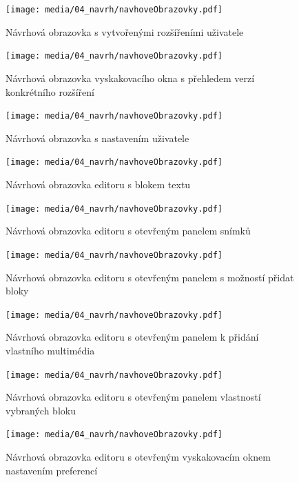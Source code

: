 \begin{figure}[ht!]
    \centering
    \texttt{[image: media/04\_navrh/navhoveObrazovky.pdf]}
    \caption{Návrhová obrazovka s vytvořenými rozšířeními uživatele}
\end{figure}

\begin{figure}[ht!]
    \centering
    \texttt{[image: media/04\_navrh/navhoveObrazovky.pdf]}
    \caption{Návrhová obrazovka vyskakovacího okna s přehledem verzí konkrétního rozšíření}
\end{figure}


\begin{figure}[ht!]
    \centering
    \texttt{[image: media/04\_navrh/navhoveObrazovky.pdf]}
    \caption{Návrhová obrazovka s nastavením uživatele}
\end{figure}

\begin{figure}[ht!]
    \centering
    \texttt{[image: media/04\_navrh/navhoveObrazovky.pdf]}
    \caption{Návrhová obrazovka editoru s blokem textu}
\end{figure}

\begin{figure}[ht!]
    \centering
    \texttt{[image: media/04\_navrh/navhoveObrazovky.pdf]}
    \caption{Návrhová obrazovka editoru s otevřeným panelem snímků}
\end{figure}


\begin{figure}[ht!]
    \centering
    \texttt{[image: media/04\_navrh/navhoveObrazovky.pdf]}
    \caption{Návrhová obrazovka editoru s otevřeným panelem s možností přidat bloky}
\end{figure}


\begin{figure}[ht!]
    \centering
    \texttt{[image: media/04\_navrh/navhoveObrazovky.pdf]}
    \caption{Návrhová obrazovka editoru s otevřeným panelem k přidání vlastního multimédia}
\end{figure}


\begin{figure}[ht!]
    \centering
    \texttt{[image: media/04\_navrh/navhoveObrazovky.pdf]}
    \caption{Návrhová obrazovka editoru s otevřeným panelem vlastností vybraných bloku}
\end{figure}


\begin{figure}[ht!]
    \centering
    \texttt{[image: media/04\_navrh/navhoveObrazovky.pdf]}
    \caption{Návrhová obrazovka editoru s otevřeným vyskakovacím oknem nastavením preferencí}
\end{figure}

